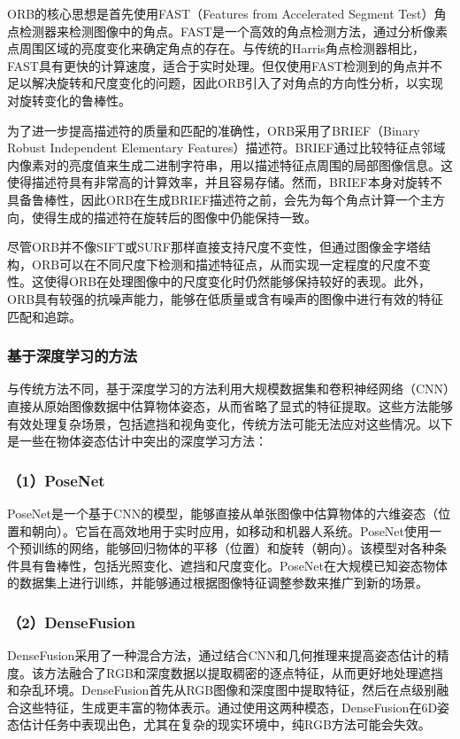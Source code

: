 ORB的核心思想是首先使用FAST（Features from Accelerated Segment Test）角点检测器来检测图像中的角点。FAST是一个高效的角点检测方法，通过分析像素点周围区域的亮度变化来确定角点的存在。与传统的Harris角点检测器相比，FAST具有更快的计算速度，适合于实时处理。但仅使用FAST检测到的角点并不足以解决旋转和尺度变化的问题，因此ORB引入了对角点的方向性分析，以实现对旋转变化的鲁棒性。

为了进一步提高描述符的质量和匹配的准确性，ORB采用了BRIEF（Binary Robust Independent Elementary Features）描述符。BRIEF通过比较特征点邻域内像素对的亮度值来生成二进制字符串，用以描述特征点周围的局部图像信息。这使得描述符具有非常高的计算效率，并且容易存储。然而，BRIEF本身对旋转不具备鲁棒性，因此ORB在生成BRIEF描述符之前，会先为每个角点计算一个主方向，使得生成的描述符在旋转后的图像中仍能保持一致。

尽管ORB并不像SIFT或SURF那样直接支持尺度不变性，但通过图像金字塔结构，ORB可以在不同尺度下检测和描述特征点，从而实现一定程度的尺度不变性。这使得ORB在处理图像中的尺度变化时仍然能够保持较好的表现。此外，ORB具有较强的抗噪声能力，能够在低质量或含有噪声的图像中进行有效的特征匹配和追踪。

\subsubsection{基于深度学习的方法}
与传统方法不同，基于深度学习的方法利用大规模数据集和卷积神经网络（CNN）直接从原始图像数据中估算物体姿态，从而省略了显式的特征提取。这些方法能够有效处理复杂场景，包括遮挡和视角变化，传统方法可能无法应对这些情况。以下是一些在物体姿态估计中突出的深度学习方法：
 \subsubsection*{（1）PoseNet}
PoseNet是一个基于CNN的模型，能够直接从单张图像中估算物体的六维姿态（位置和朝向）。它旨在高效地用于实时应用，如移动和机器人系统。PoseNet使用一个预训练的网络，能够回归物体的平移（位置）和旋转（朝向）。该模型对各种条件具有鲁棒性，包括光照变化、遮挡和尺度变化。PoseNet在大规模已知姿态物体的数据集上进行训练，并能够通过根据图像特征调整参数来推广到新的场景。
 \subsubsection*{（2）DenseFusion}
DenseFusion采用了一种混合方法，通过结合CNN和几何推理来提高姿态估计的精度。该方法融合了RGB和深度数据以提取稠密的逐点特征，从而更好地处理遮挡和杂乱环境。DenseFusion首先从RGB图像和深度图中提取特征，然后在点级别融合这些特征，生成更丰富的物体表示。通过使用这两种模态，DenseFusion在6D姿态估计任务中表现出色，尤其在复杂的现实环境中，纯RGB方法可能会失效。
